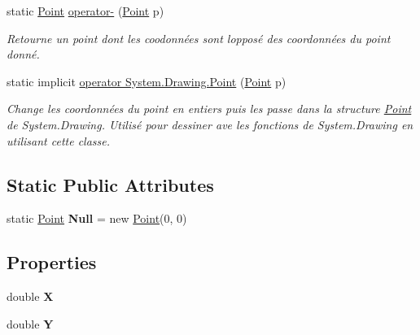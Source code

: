 \begin{DoxyCompactItemize}
static \hyperlink{class_tentacle_slicers_1_1general_1_1_point}{Point} \hyperlink{class_tentacle_slicers_1_1general_1_1_point_a5b407645cb8640246167e7c5babb5077}{operator-\/} (\hyperlink{class_tentacle_slicers_1_1general_1_1_point}{Point} p)
\begin{DoxyCompactList}\small\item\em Retourne un point dont les coodonnées sont l\textquotesingle{}opposé des coordonnées du point donné. \end{DoxyCompactList}\item 
static implicit \hyperlink{class_tentacle_slicers_1_1general_1_1_point_a65efc1d175521859132daa1046577d89}{operator System.\+Drawing.\+Point} (\hyperlink{class_tentacle_slicers_1_1general_1_1_point}{Point} p)
\begin{DoxyCompactList}\small\item\em Change les coordonnées du point en entiers puis les passe dans la structure \hyperlink{class_tentacle_slicers_1_1general_1_1_point}{Point} de System.\+Drawing. Utilisé pour dessiner ave les fonctions de System.\+Drawing en utilisant cette classe. \end{DoxyCompactList}\end{DoxyCompactItemize}
\subsection*{Static Public Attributes}
\begin{DoxyCompactItemize}
\item 
\mbox{\label{class_tentacle_slicers_1_1general_1_1_point_ad67ac977492e558d4c0af813d2b4de7f}} 
static \hyperlink{class_tentacle_slicers_1_1general_1_1_point}{Point} {\bfseries Null} = new \hyperlink{class_tentacle_slicers_1_1general_1_1_point}{Point}(0, 0)
\end{DoxyCompactItemize}
\subsection*{Properties}
\begin{DoxyCompactItemize}
\item 
\mbox{\label{class_tentacle_slicers_1_1general_1_1_point_aeebf5268d455b430e054156b5532f050}} 
double {\bfseries X}
\item 
\mbox{\label{class_tentacle_slicers_1_1general_1_1_point_a329e474e30e55722e26c9861da6be350}} 
double {\bfseries Y}
\end{DoxyCompactItemize}


